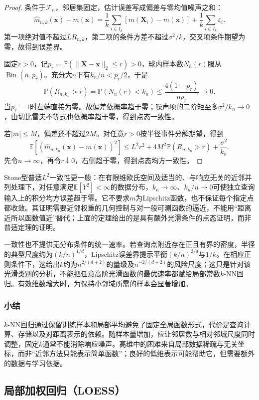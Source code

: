 \begin{proof}
条件于$\mathcal F_n$，邻居集固定，估计误差写成偏差与零均值噪声之和：
\[
  \widehat m_{n,k}(\bm{x})-m(\bm{x})
  =\frac1k\sum_{i\in I_k}[m(\bm{X}_i)-m(\bm{x})]
   +\frac1k\sum_{i\in I_k}\varepsilon_i.
\]
第一项绝对值不超过$LR_{n,k}$，第二项的条件方差不超过$\sigma^2/k$，交叉项条件期望为零，故得到误差界。

固定$r>0$，记$p_r=\mathbb{P}(\lVert\bm{X}-\bm{x}\rVert_2\leq r)>0$，球内样本数$N_n(r)$服从$\operatorname{Bin}(n,p_r)$。充分大$n$下有$k_n/n<p_r/2$，于是
\[
  \mathbb{P}(R_{n,k_n}>r)
  =\mathbb{P}(N_n(r)<k_n)
  \leq\frac{4(1-p_r)}{np_r}\longrightarrow0.
\]
当$p_r=1$时左端直接为零。故偏差依概率趋于零；噪声项的二阶矩至多$\sigma^2/k_n\to0$，由切比雪夫不等式也依概率趋于零，得到点态一致性。

若$|m|\leq M$，偏差还不超过$2M$。对任意$r>0$按半径事件分解期望，得到
\[
  \mathbb{E}[(\widehat m_{n,k_n}(\bm{x})-m(\bm{x}))^2]
  \leq L^2r^2+4M^2\mathbb{P}(R_{n,k_n}>r)+\frac{\sigma^2}{k_n}.
\]
先令$n\to\infty$，再令$r\downarrow0$，右侧趋于零，得到点态均方一致性。
\end{proof}

Stone型普适$L^2$一致性更一般：在有限维欧氏空间及适当的、与响应无关的近邻并列处理下，对任意满足$\mathbb{E}[Y^2]<\infty$的数据分布，$k_n\to\infty$、$k_n/n\to0$可使独立查询输入上的积分均方误差趋于零。它不要求$m$为Lipschitz函数，也不保证每个指定点都收敛。其证明需要近邻权重的几何控制与对一般可测函数的逼近，不能用“距离近所以函数值近”替代；上面的定理给出的是具有额外光滑条件的点态证明，而非普适定理的证明。

一致性也不提供无分布条件的统一速率。若查询点附近存在正且有界的密度，半径的典型尺度约为$(k/n)^{1/d}$，Lipschitz误差界提示平衡$(k/n)^{2/d}$与$1/k$。在相应正则条件下，这给出$k$约为$n^{2/(d+2)}$的量级及$n^{-2/(d+2)}$的风险尺度；这只是针对该光滑类别的分析，不能把任意高阶光滑函数的最优速率都赋给局部常数$k$-NN回归。有效维数增大时，为保持小邻域所需的样本会显著增加。

\subsubsection{小结}

$k$-NN回归通过保留训练样本和局部平均避免了固定全局函数形式，代价是查询计算、存储以及对距离表示的依赖。随样本量增加，应让邻居数与相对邻域尺度同时调整，固定$k$通常不能消除响应噪声。高维中的困难来自局部数据稀疏与无关坐标，而非“近邻方法只能表示简单函数”；良好的低维表示可能帮助它，但需要额外的数据与学习依据。

\subsection{局部加权回归（LOESS）}
\label{sec:regression-loess}

